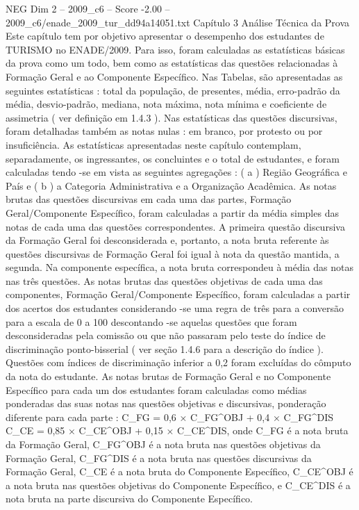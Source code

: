 \begin{textsample}{NEG Dim 2 – 2009\_c6 – Score -2.00 – 2009\_c6/enade\_2009\_tur\_dd94a14051.txt}  \label{ex:f2_neg_132}
Capítulo 3 Análise Técnica da Prova Este capítulo tem por objetivo apresentar o desempenho dos estudantes de TURISMO no ENADE/2009.
Para isso, foram calculadas as estatísticas básicas da prova como um todo, bem como as estatísticas das questões relacionadas à Formação Geral e ao Componente Específico.
Nas Tabelas, são apresentadas as seguintes estatísticas : total da população, de presentes, média, erro-padrão da média, desvio-padrão, mediana, nota máxima, nota mínima e coeficiente de assimetria ( ver definição em 1.4.3 ).
Nas estatísticas das questões discursivas, foram detalhadas também as notas nulas : em branco, por protesto ou por insuficiência.
As estatísticas apresentadas neste capítulo contemplam, separadamente, os ingressantes, os concluintes e o total de estudantes, e foram calculadas tendo -se em vista as seguintes agregações : ( a ) Região Geográfica e País e ( b ) a Categoria Administrativa e a Organização Acadêmica.
As notas brutas das questões discursivas em cada uma das partes, Formação Geral/Componente Específico, foram calculadas a partir da média simples das notas de cada uma das questões correspondentes.
A primeira questão discursiva da Formação Geral foi desconsiderada e, portanto, a nota bruta referente às questões discursivas de Formação Geral foi igual à nota da questão mantida, a segunda.
Na componente específica, a nota bruta correspondeu à média das notas nas três questões.
As notas brutas das questões objetivas de cada uma das componentes, Formação Geral/Componente Específico, foram calculadas a partir dos acertos dos estudantes considerando -se uma regra de três para a conversão para a escala de 0 a 100 descontando -se aquelas questões que foram desconsideradas pela comissão ou que não passaram pelo teste do índice de discriminação ponto-bisserial ( ver seção 1.4.6 para a descrição do índice ).
Questões com índices de discriminação inferior a 0,2 foram excluídas do cômputo da nota do estudante.
As notas brutas de Formação Geral e no Componente Específico para cada um dos estudantes foram calculadas como médias ponderadas das suas notas nas questões objetivas e discursivas, ponderação diferente para cada parte : C\_FG = 0,6 × C\_FG\textasciicircum{}OBJ + 0,4 × C\_FG\textasciicircum{}DIS C\_CE = 0,85 × C\_CE\textasciicircum{}OBJ + 0,15 × C\_CE\textasciicircum{}DIS, onde C\_FG é a nota bruta da Formação Geral, C\_FG\textasciicircum{}OBJ é a nota bruta nas questões objetivas da Formação Geral, C\_FG\textasciicircum{}DIS é a nota bruta nas questões discursivas da Formação Geral, C\_CE é a nota bruta do Componente Específico, C\_CE\textasciicircum{}OBJ é a nota bruta nas questões objetivas do Componente Específico, e C\_CE\textasciicircum{}DIS é a nota bruta na parte discursiva do Componente Específico.

\end{textsample}
